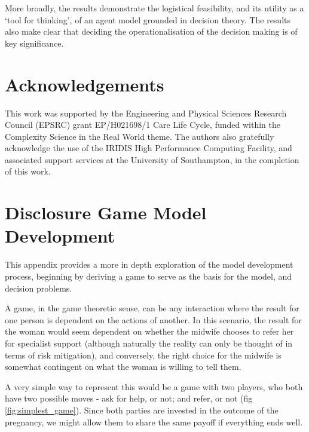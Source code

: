 \documentclass[graybox]{svmult}
\begin{document}
More broadly, the results demonstrate the logistical feasibility, and its utility as a `tool for thinking', of an agent model grounded in decision theory. The results also make clear that deciding the operationalisation of the decision making is of key significance.

 \section*{Acknowledgements}
\label{sec:acknowledgements}

This work was supported by the Engineering and Physical Sciences Research Council 
(EPSRC) grant EP/H021698/1 Care Life Cycle, funded within the Complexity 
Science in the Real World theme. The authors also gratefully acknowledge the use of the IRIDIS High Performance Computing Facility, and associated support services at the University of Southampton, in the completion of this work. 


\section{Disclosure Game Model Development}
\label{app:model_description}

This appendix provides a more in depth exploration of the model development process, beginning by deriving a game to serve as the basis for the model, and decision problems.

A game, in the game theoretic sense, can be any interaction where the result for one person is dependent on the actions of another. In this scenario, the result for the woman would seem dependent on whether the midwife chooses to refer her for specialist support (although naturally the reality can only be thought of in terms of risk mitigation), and conversely, the right choice for the midwife is somewhat contingent on what the woman is willing to tell them.

A very simple way to represent this would be a game with two players, who both have two possible moves - ask for help, or not; and refer, or not (fig \ref{fig:simplest_game}). Since both parties are invested in the outcome of the pregnancy, we might allow them to share the same payoff if everything ends well.
\end{document}
